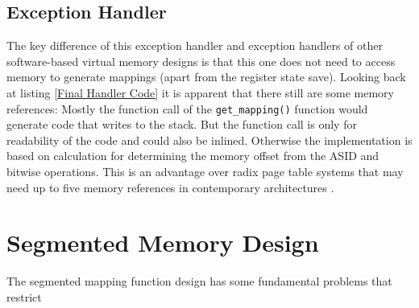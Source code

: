 \subsection{Exception Handler} The key difference of this exception handler and exception handlers
of other software-based virtual memory designs is that this one does not need to access
memory to generate mappings (apart from the register state save).
Looking back at listing \ref{Final Handler Code} it is apparent that there still are some
memory references:
Mostly the function call of the \texttt{get\_mapping()} function would generate code that
writes to the stack. But the function call is only for readability of the code and could also
be inlined.
Otherwise the implementation is based on calculation for determining the memory offset from
the ASID and bitwise operations.
This is an advantage over radix page table systems that may need up to five memory references
in contemporary architectures \cite{intel5LevelPaging5Level2017}.

\section{Segmented Memory Design}
The segmented mapping function design has some fundamental problems that restrict


